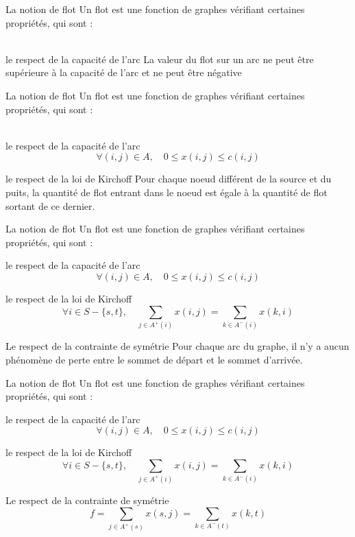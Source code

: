 \begin{frame}{La notion de flot}
	Un flot est une fonction de graphes vérifiant certaines propriétés, qui sont : ~\\~\\
	\begin{exampleblock}{le respect de la capacité de l'arc}
		La valeur du flot sur un arc ne peut être supérieure à la capacité de l'arc et ne peut être négative
	\end{exampleblock}\vfill
\end{frame} 

\begin{frame}{La notion de flot}
	Un flot est une fonction de graphes vérifiant certaines propriétés, qui sont :~\\~\\
	\begin{block}{le respect de la capacité de l'arc}
		$$\forall (i,j) \in A, \quad 0 \leq x(i,j) \leq c(i,j)$$
	\end{block}\vfill
	\begin{exampleblock}{le respect de la loi de Kirchoff}
		Pour chaque noeud différent de la source et du puits, la quantité de flot entrant dans le noeud
		est égale à la quantité de flot sortant de ce dernier.
	\end{exampleblock}\vfill
\end{frame} 

\begin{frame}{La notion de flot}
	Un flot est une fonction de graphes vérifiant certaines propriétés, qui sont : 
	\begin{block}{le respect de la capacité de l'arc}
		$$\forall (i,j) \in A, \quad 0 \leq x(i,j) \leq c(i,j)$$
	\end{block}\vfill
	\begin{block}{le respect de la loi de Kirchoff}
		$$\forall i \in S - \{s,t\}, \quad \sum_{j \in A^+(i)} x(i,j) = \sum_{k\in A^-(i)} x(k,i)$$
	\end{block}\vfill
	\begin{exampleblock}{Le respect de la contrainte de symétrie}
		Pour chaque arc du graphe, il n'y a aucun phénomène de perte entre le sommet de départ et le
		sommet d'arrivée.
	\end{exampleblock}\vfill
\end{frame} 

\begin{frame}{La notion de flot}
	Un flot est une fonction de graphes vérifiant certaines propriétés, qui sont : 
	\begin{block}{le respect de la capacité de l'arc}
		$$\forall (i,j) \in A, \quad 0 \leq x(i,j) \leq c(i,j)$$
	\end{block}\vfill
	\begin{block}{le respect de la loi de Kirchoff}
		$$\forall i \in S - \{s,t\}, \quad \sum_{j \in A^+(i)} x(i,j) = \sum_{k\in A^-(i)} x(k,i)$$
	\end{block}\vfill
	\begin{block}{Le respect de la contrainte de symétrie}
		$$ f = \sum_{j \in A^+(s)} x(s,j) = \sum_{k\in A^- (t)} x(k,t) $$ 
	\end{block}\vfill
\end{frame} 

